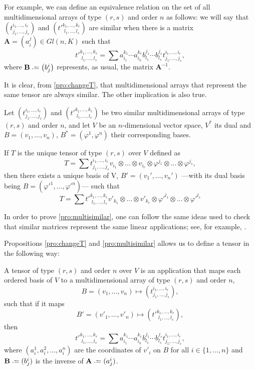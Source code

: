 For example, we can define an equivalence relation on the set of all multidimensional arrays of type $(r,s)$ and order $n$ as follows: we will say that $\left( t_{j_1,\dots,j_s}^{i_1,\dots,i_r} \right)$ and $\left( t'^{k_1,\dots,k_r}_{\phantom{'}l_1,\dots,l_s} \right)$ are similar when there is a matrix $\mathbf{A} = \left(a^j_i\right) \in Gl(n,K)$ such that
\[
	t'^{k_1,\dots,k_r}_{\phantom{'}l_1,\dots,l_s} = \sum a_{i_1}^{k_1} \cdots a_{i_k}^{k_r} b_{l_1}^{j_1} \cdots b_{l_s}^{j_s} t_{j_1,\dots,j_s}^{i_1,\dots,i_r},
\]
where $\mathbf{B} \defeq \left( b^i_j\right)$ represents, as usual, the matrix $\mathbf{A}^{-1}$.

It is clear, from \autoref{pro:changeT}, that multidimensional arrays that represent the same tensor are always similar. The other implication is also true.

\begin{proposition}
	\label{pro:multisimilar}
	Let $\left( t_{j_1,\dots,j_s}^{i_1,\dots,i_r} \right)$ and $\left( t'^{k_1,\dots,k_r}_{\phantom{'}l_1,\dots,l_s} \right)$ be two similar multidimensional arrays of type $(r,s)$ and order $n$, and let $V$ be an $n$-dimensional vector space, $V^*$ its dual and $B = (v_1, \dots, v_n)$, $B^* = (\varphi^1, \varphi^n)$ their corresponding bases.
	
	If $T$ is the unique tensor of type $(r,s)$ over $V$ defined as
	\[
	T = \sum t_{j_1,\dots,j_s}^{i_1,\dots,i_r} v_{i_1} \otimes \dots \otimes v_{i_r} \otimes \varphi^{j_1} \otimes \dots \otimes \varphi^{j_s},
	\]
	then there exists a unique basis of V, $B' = (v_1', \dots, v_n')$ ---with its dual basis being $B = (\varphi'^1, \dots, \varphi'^n)$--- such that
	\[
	T = \sum t'^{k_1,\dots,k_r}_{\phantom{'}l_1,\dots,l_s} v'_{k_1} \otimes \dots \otimes v'_{k_r} \otimes \varphi'^{l_1} \otimes \dots \otimes \varphi'^{l_s}
	\]
\end{proposition}

In order to prove \autoref{pro:multisimilar}, one can follow the same ideas used to check that similar matrices represent the same linear applications; see, for example, \cite[p. 145]{romero86}.

Propositions \ref{pro:changeT} and \ref{pro:multisimilar} allows us to define a tensor in the following way:

\begin{definition}
	A tensor of type $(r,s)$ and order $n$ over $V$ is an application that maps each ordered basis of $V$ to a multidimensional array of type $(r,s)$ and order $n$,
	\[
		B = (v_1, \dots, v_n) \mapsto \left( t_{j_1,\dots,j_s}^{i_1,\dots,i_r} \right),
	\]
	such that if it maps 
	\[
		B' = (v'_1, \dots, v'_n) \mapsto \left( t'^{k_1,\dots,k_r}_{\phantom{'}l_1,\dots,l_s} \right),
	\]
	then
	\[
	t'^{k_1,\dots,k_r}_{\phantom{'}l_1,\dots,l_s} = \sum a_{i_1}^{k_1} \cdots a_{i_k}^{k_r} b_{l_1}^{j_1} \cdots b_{l_s}^{j_s} t_{j_1,\dots,j_s}^{i_1,\dots,i_r},
	\]
	where $(a_i^1, a_i^2, \dots, a_i^n)$ are the coordinates of $v'_i$ on $B$ for all $i \in \{1, \dots, n\}$ and $\mathbf{B} \defeq (b^i_j)$ is the inverse of $\mathbf{A} \defeq (a^i_j)$.
\end{definition}

